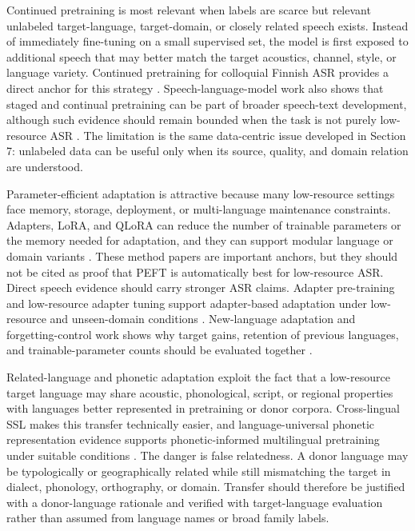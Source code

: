 \documentclass[pdflatex,sn-basic,iicol]{sn-jnl}
\theoremstyle{thmstyleone}
\theoremstyle{thmstyletwo}
\theoremstyle{thmstylethree}
\begin{document}
Continued pretraining is most relevant when labels are scarce but relevant unlabeled target-language, target-domain, or closely related speech exists. Instead of immediately fine-tuning on a small supervised set, the model is first exposed to additional speech that may better match the target acoustics, channel, style, or language variety. Continued pretraining for colloquial Finnish ASR provides a direct anchor for this strategy \citep{getman24_interspeech}. Speech-language-model work also shows that staged and continual pretraining can be part of broader speech-text development, although such evidence should remain bounded when the task is not purely low-resource ASR \citep{tian25b_interspeech}. The limitation is the same data-centric issue developed in Section 7: unlabeled data can be useful only when its source, quality, and domain relation are understood.

Parameter-efficient adaptation is attractive because many low-resource settings face memory, storage, deployment, or multi-language maintenance constraints. Adapters, LoRA, and QLoRA can reduce the number of trainable parameters or the memory needed for adaptation, and they can support modular language or domain variants \citep{pmlr-v97-houlsby19a,hu2022lora,dettmers2023qlora}. These method papers are important anchors, but they should not be cited as proof that PEFT is automatically best for low-resource ASR. Direct speech evidence should carry stronger ASR claims. Adapter pre-training and low-resource adapter tuning support adapter-based adaptation under low-resource and unseen-domain conditions \citep{udupa24_interspeech}. New-language adaptation and forgetting-control work shows why target gains, retention of previous languages, and trainable-parameter counts should be evaluated together \citep{qian24_interspeech}.

Related-language and phonetic adaptation exploit the fact that a low-resource target language may share acoustic, phonological, script, or regional properties with languages better represented in pretraining or donor corpora. Cross-lingual SSL makes this transfer technically easier, and language-universal phonetic representation evidence supports phonetic-informed multilingual pretraining under suitable conditions \citep{feng23_interspeech}. The danger is false relatedness. A donor language may be typologically or geographically related while still mismatching the target in dialect, phonology, orthography, or domain. Transfer should therefore be justified with a donor-language rationale and verified with target-language evaluation rather than assumed from language names or broad family labels.
\end{document}

